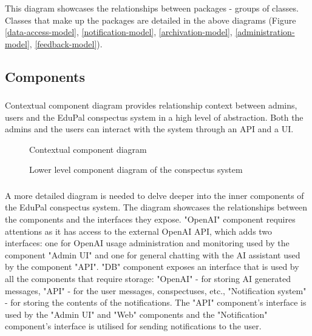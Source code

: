 \documentclass[
    english, %
]{VUMIFPSkursinis}
\begin{document}
\subsubsection*{} This diagram showcases the relationships between packages - groups of classes. Classes that make up the packages are detailed in the above diagrams (Figure \ref{data-access-model}, \ref{notification-model}, \ref{archivation-model}, \ref{administration-model}, \ref{feedback-model}).

\subsection{Components}

\subsubsection*{} Contextual component diagram provides relationship context between admins, users and the EduPal conspectus system in a high level of abstraction. Both the admins and the users can interact with the system through an API and a UI.

\begin{figure}[ht]
    \centering
    
    \caption{Contextual component diagram}
    \label{component-level-1}
\end{figure}

\begin{figure}[ht]
    \centering
    
    \caption{Lower level component diagram of the conspectus system}
    \label{component-level-2}
\end{figure}

\subsubsection*{} A more detailed diagram is needed to delve deeper into the inner components of the EduPal conspectus system. The diagram showcases the relationships between the components and the interfaces they expose. "OpenAI" component requires attentions as it has access to the external OpenAI API, which adds two interfaces: one for OpenAI usage administration and monitoring used by the component "Admin UI" and one for general chatting with the AI assistant used by the component "API". "DB" component exposes an interface that is used by all the components that require storage: "OpenAI" - for storing AI generated messages, "API" - for the user messages, conspectuses, etc., "Notification system" - for storing the contents of the notifications. The "API" component's interface is used by the "Admin UI" and "Web" components and the "Notification" component's interface is utilised for sending notifications to the user.
\end{document}

